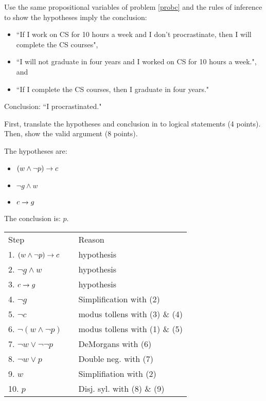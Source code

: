 \begin{questions}
 Use the same propositional variables of problem \ref{probc} and the rules of inference to show the hypotheses imply the conclusion:
\begin{itemize}[itemsep=0pt,parsep=0pt,topsep=0pt,partopsep=0pt]
    \item ``If I work on CS for 10 hours a week and I don't procrastinate, then I will complete the CS courses",
    \item ``I will not graduate in four years and I worked on CS for 10 hours a week.", and
    \item ``If I complete the CS courses, then I graduate in four years."
\end{itemize}
Conclusion:  ``I procrastinated."

First, translate the hypotheses and conclusion in to logical statements (4 points).  Then, show the valid argument (8 points).
    \ifprintanswers
        \vspace{-12pt}
    \fi
\begin{solution}

    The hypotheses are: 
    \begin{itemize}[itemsep=0pt,parsep=0pt,topsep=0pt,partopsep=0pt]
      \item $(w \wedge \neg p) \rightarrow c$
      \item $\neg g \wedge w$
      \item $c \rightarrow g$
    \end{itemize}
    The conclusion is: $p$.

        \begin{tabular}{lll}
        Step    & \hspace{0.2in} & Reason \\
        1. $(w \wedge \neg p) \rightarrow c$        & & hypothesis \\
        2. $\neg g \wedge w$                & & hypothesis \\
        3. $c \rightarrow g$                      & & hypothesis \\
        4. $\neg g$             & & Simplification with (2) \\
        5. $\neg c$             & & modus tollens with (3) \& (4) \\
        6. $\neg (w \wedge \neg p)$     & & modus tollens with (1) \& (5) \\
        7. $\neg w \vee \neg \neg p$      & & DeMorgans with (6) \\
        8. $\neg w \vee p$          & & Double neg. with (7) \\
        9.  $w$               & & Simplifiation with (2) \\
        10. $p$               & & Disj. syl. with (8) \& (9) \\
        \end{tabular}
\end{solution}



\end{questions}

